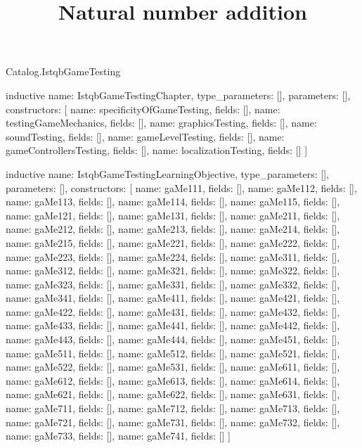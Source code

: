 \begin{lexlean}{Catalog.IstqbGameTesting}
\title{Natural number addition}
\begin{semanticmodule}
inductive{
  name: IstqbGameTestingChapter,
  type_parameters: [],
  parameters: [],
  constructors: [
    {name: specificityOfGameTesting, fields: []},
    {name: testingGameMechanics, fields: []},
    {name: graphicsTesting, fields: []},
    {name: soundTesting, fields: []},
    {name: gameLevelTesting, fields: []},
    {name: gameControllersTesting, fields: []},
    {name: localizationTesting, fields: []}
  ]
}

inductive{
  name: IstqbGameTestingLearningObjective,
  type_parameters: [],
  parameters: [],
  constructors: [
    {name: gaMe111, fields: []},
    {name: gaMe112, fields: []},
    {name: gaMe113, fields: []},
    {name: gaMe114, fields: []},
    {name: gaMe115, fields: []},
    {name: gaMe121, fields: []},
    {name: gaMe131, fields: []},
    {name: gaMe211, fields: []},
    {name: gaMe212, fields: []},
    {name: gaMe213, fields: []},
    {name: gaMe214, fields: []},
    {name: gaMe215, fields: []},
    {name: gaMe221, fields: []},
    {name: gaMe222, fields: []},
    {name: gaMe223, fields: []},
    {name: gaMe224, fields: []},
    {name: gaMe311, fields: []},
    {name: gaMe312, fields: []},
    {name: gaMe321, fields: []},
    {name: gaMe322, fields: []},
    {name: gaMe323, fields: []},
    {name: gaMe331, fields: []},
    {name: gaMe332, fields: []},
    {name: gaMe341, fields: []},
    {name: gaMe411, fields: []},
    {name: gaMe421, fields: []},
    {name: gaMe422, fields: []},
    {name: gaMe431, fields: []},
    {name: gaMe432, fields: []},
    {name: gaMe433, fields: []},
    {name: gaMe441, fields: []},
    {name: gaMe442, fields: []},
    {name: gaMe443, fields: []},
    {name: gaMe444, fields: []},
    {name: gaMe451, fields: []},
    {name: gaMe511, fields: []},
    {name: gaMe512, fields: []},
    {name: gaMe521, fields: []},
    {name: gaMe522, fields: []},
    {name: gaMe531, fields: []},
    {name: gaMe611, fields: []},
    {name: gaMe612, fields: []},
    {name: gaMe613, fields: []},
    {name: gaMe614, fields: []},
    {name: gaMe621, fields: []},
    {name: gaMe622, fields: []},
    {name: gaMe631, fields: []},
    {name: gaMe711, fields: []},
    {name: gaMe712, fields: []},
    {name: gaMe713, fields: []},
    {name: gaMe721, fields: []},
    {name: gaMe731, fields: []},
    {name: gaMe732, fields: []},
    {name: gaMe733, fields: []},
    {name: gaMe741, fields: []}
  ]
}


\end{semanticmodule}
\end{lexlean}
